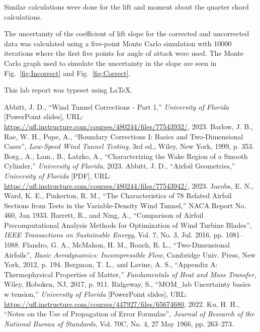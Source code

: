 \documentclass[journal,letterpaper]{IEEEtran}
\begin{document}
Similar calculations were done for the lift and moment about the quarter chord calculations.

The uncertainty of the coefficient of lift slope for the corrected and uncorrected data was calculated using a five-point Monte Carlo simulation with 10000 iterations where the first five points for angle of attack were used.
The Monte Carlo graph used to simulate the uncertainty in the slope are seen in Fig.~\ref{fig:Incorrect} and Fig.~\ref{fig:Correct}.

\noindent
This lab report was typeset using \LaTeX.

\begin{thebibliography}{99}
     Abbitt, J. D., ``Wind Tunnel Corrections - Part 1,'' \textit{University of Florida} [PowerPoint slides], URL: \url{https://ufl.instructure.com/courses/480244/files/77543932/}, 2023.
     Barlow, J. B., Rae, W. H., Pope, A., ``Boundary Corrections I: Basics and Two-Dimensional Cases'', \textit{Low-Speed Wind Tunnel Testing}, 3rd ed., Wiley, New York, 1999, p. 353.
     Borg., A., Lam., B., Latzko, A., ``Characterizing the Wake Region of a Smooth Cylinder,'' \textit{University of Florida}, 2023.
     Abbitt, J. D., ``Airfoil Geometries,'' \textit{University of Florida} [PDF], URL: \url{https://ufl.instructure.com/courses/480244/files/77543942/}, 2023.
     Jacobs, E. N., Ward, K. E., Pinkerton, R. M., ``The Characteristics of 78 Related Airfoil Sections from Tests in the Variable-Density Wind Tunnel,'' NACA Report No. 460, Jan 1933.
     Barrett, R., and Ning, A., ``Comparison of Airfoil Precomputational Analysis Methods for Optimization of Wind Turbine Blades'', \textit{IEEE Transactions on Sustainable Energy}, Vol. 7, No. 3, Jul. 2016, pp. 1081--1088.
     Flandro, G. A., McMahon, H. M., Roach, R. L., ``Two-Dimensional Airfoils'', \textit{Basic Aerodynamics: Incompressible Flow}, Cambridge Univ. Press, New York, 2012, p. 194.
     Bergman, T. L., and Lavine, A. S., ``Appendix A: Thermophysical Properties of Matter,'' \textit{Fundamentals of Heat and Mass Transfer}, Wiley, Hoboken, NJ, 2017, p. 911.
     Ridgeway, S., ``MOM\_lab Uncertainty basics w tension,'' \textit{University of Florida} [PowerPoint slides], URL: \url{https://ufl.instructure.com/courses/447927/files/65674680}, 2022.
     Ku, H. H., ``Notes on the Use of Propagation of Error Formulas'', \textit{Journal of Research of the National Bureau of Standards}, Vol. 70C, No. 4, 27 May 1966, pp. 263--273.
\end{thebibliography}
\end{document}
